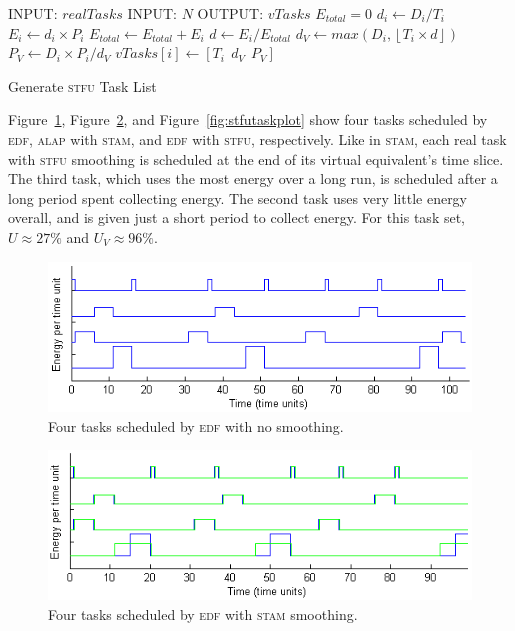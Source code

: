 \begin{algorithm}[htb]
\label{alg:stfualg}
\begin{algorithmic}
\STATE INPUT: $realTasks$  
\STATE INPUT: $N$ 
\STATE OUTPUT: $vTasks$ 
\STATE $E_{total} = 0$
\STATE $d_i \gets D_i / T_i$
\STATE $E_i \gets d_i \times P_i$
\STATE $E_{total} \gets E_{total} +E_i$
\ENDFOR
{}
\STATE $d \gets E_i / E_{total}$
\STATE $d_{V} \gets max(D_i, \left \lfloor T_i \times d \right \rfloor)$
\STATE $P_V \gets D_i \times P_i / d_{V}$
\STATE $vTasks[i] \gets [T_i~~d_{V}~~P_V]$
\ENDFOR
\end{algorithmic}
\caption{Generate \textsc{stfu} Task List}
\end{algorithm}

Figure~\ref{fig:edftasksched}, Figure~\ref{fig:stamtaskplot}, and Figure~\ref{fig:stfutaskplot} show four tasks scheduled by \textsc{edf}, \textsc{alap} with \textsc{stam}, and \textsc{edf} with \textsc{stfu}, respectively.  Like in \textsc{stam}, each real task with \textsc{stfu} smoothing is scheduled at the end of its virtual equivalent's time slice.  The third task, which uses the most energy over a long run, is scheduled after a long period spent collecting energy.  The second task uses very little energy overall, and is given just a short period to collect energy.  For this task set, $U \approx 27\%$ and $U_V \approx 96\%$.


\begin{figure}[htb]
\includegraphics[scale=0.64]{edftasks.png}
\caption{Four tasks scheduled by \textsc{edf} with no smoothing.\label{fig:edftasksched}}
\end{figure}

\begin{figure}[htb]
\includegraphics[scale=0.64]{stamtasks.png}
\caption{Four tasks scheduled by \textsc{edf} with \textsc{stam} smoothing.\label{fig:stamtaskplot}}
\end{figure}


